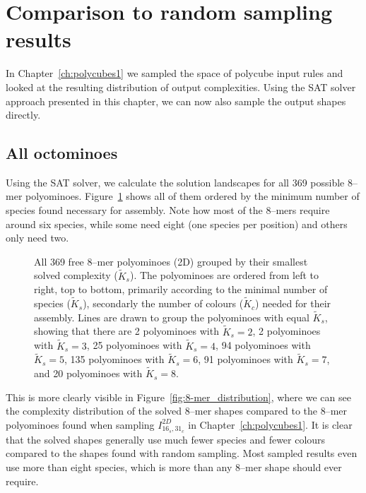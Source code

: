 

\FloatBarrier
\section{Comparison to random sampling results}
In Chapter~\ref{ch:polycubes1} we sampled the space of polycube input rules and looked at the resulting distribution of output complexities. Using the SAT solver approach presented in this chapter, we can now also sample the output shapes directly. 

\subsection{All octominoes}
Using the SAT solver, we calculate the solution landscapes for all 369 possible 8--mer polyominoes. Figure~\ref{fig:8-mers_grid} shows all of them ordered by the minimum number of species found necessary for assembly. Note how most of the 8--mers require around six species, while some need eight (one species per position) and others only need two.

\begin{figure}[h!]
    \centering
    
    \caption{All 369 free 8--mer polyominoes (2D) grouped by their smallest solved complexity (\(\widetilde{K}_s\)). The polyominoes are ordered from left to right, top to bottom, primarily according to the minimal number of species (\(\widetilde{K}_s\)), secondarly the number of colours (\(\widetilde{K}_c\)) needed for their assembly. Lines are drawn to group the polyominoes with equal \(\widetilde{K}_s\), showing that there are 
    2 polyominoes with \(\widetilde{K}_s=2\),
    2 polyominoes with \(\widetilde{K}_s=3\),
    25 polyominoes with \(\widetilde{K}_s=4\),
    94 polyominoes with \(\widetilde{K}_s=5\),
    135 polyominoes with \(\widetilde{K}_s=6\),
    91 polyominoes with \(\widetilde{K}_s=7\), and
    20 polyominoes with \(\widetilde{K}_s=8\).
    }
    \label{fig:8-mers_grid}
\end{figure}

This is more clearly visible in Figure~\ref{fig:8-mer_distribution}, where we can see the complexity distribution of the solved 8--mer shapes compared to the 8--mer polyominoes found when sampling \(I_{16_s,31_c}^{2D}\) in Chapter~\ref{ch:polycubes1}. It is clear that the solved shapes generally use much fewer species and fewer colours compared to the shapes found with random sampling. Most sampled results even use more than eight species, which is more than any 8--mer shape should ever require.

